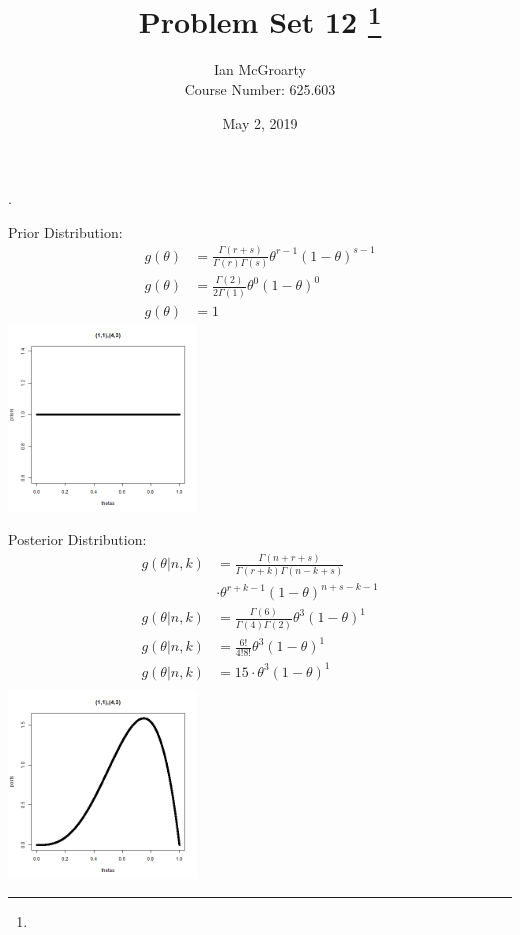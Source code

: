 \documentclass[12pt]{article}
\title{Problem Set 12 \thanks{}}
\author{Ian McGroarty \\
	Course Number: 625.603}
\date{May 2, 2019}
\newenvironment{problem}[2][Problem]{\begin{trivlist}
\item[\hskip \labelsep {\bfseries #1}\hskip \labelsep {\bfseries #2.}]}{\end{trivlist}}
\begin{document}
\maketitle
\newpage

\begin{problem}{(1,1),(4,3)}.
\begin{multicols}{2}
 Prior Distribution: 
\begin{align*}
  g(\theta) &= \frac{\Gamma (r+s)}{\Gamma (r) \Gamma (s)} \theta^{r-1}(1-\theta)^{s-1} \\
    g(\theta) &= \frac{\Gamma (2)}{2\Gamma (1)} \theta^{0}(1-\theta)^{0} \\
    g(\theta) &= 1 
\end{align*}
\columnbreak
  \includegraphics[width=5cm]{1143_prior2.png}
 \label{fig:boat1}
\end{multicols}

\begin{multicols}{2}
Posterior Distribution: 
\begin{align*}
    g(\theta | n,k) &= \frac{\Gamma (n+r+s)}{\Gamma (r+k) \Gamma (n-k+s)} \\
    & \cdot \theta^{r+k-1}(1-\theta)^{n+s-k-1} \\
    g(\theta | n,k) &= \frac{\Gamma (6)}{\Gamma (4) \Gamma (2)} \theta^{3}(1-\theta)^{1} \\
    g(\theta | n,k) &= \frac{6!}{4!8!} \theta^{3}(1-\theta)^{1} \\
    g(\theta | n,k) &= 15 \cdot \theta^{3}(1-\theta)^{1} \\
\end{align*}
\columnbreak
  \includegraphics[width=5cm]{1143_post.png}
 \label{fig:boat1}
\end{multicols}


\end{problem}
\end{document}

